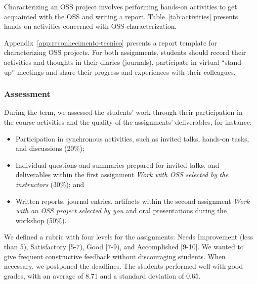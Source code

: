 \documentclass[sigconf]{acmart}
\begin{document}
Characterizing an OSS project involves performing hands-on activities to get acquainted with the OSS and writing a report.
Table~\ref{tab:activities} presents hands-on activities concerned with OSS characterization.



Appendix~\ref{app:reconhecimento-tecnico} presents a report template for characterizing OSS projects.
For both assignments, students should record their activities and thoughts in their diaries (journals),  participate in virtual ``stand-up'' meetings and share their progress and experiences with their colleagues.

\subsubsection{Assessment}

During the term, we assessed  the students' work through their participation in the course activities and the quality of the assignments' deliverables, for instance:
\begin{itemize}
    \item Participation in synchronous activities, such as invited talks, hands-on tasks, and discussions (20\%);
    \item Individual questions and summaries prepared for invited talks, and deliverables within the first assignment \textit{Work with OSS selected by the instructors} (30\%); and
    \item Written reports, journal entries, artifacts within the second assignment \textit{Work with an OSS project selected by you}  and oral presentations during the workshop (50\%).
\end{itemize}

We defined a rubric with four levels for the assignments: Needs Improvement (less than 5), Satisfactory [5-7), Good [7-9), and Accomplished [9-10]. We wanted to give frequent constructive feedback without discouraging students. When necessary, we postponed the deadlines. The students performed well with good grades, with an average of 8.71 and a standard deviation of 0.65. 



\end{document}
